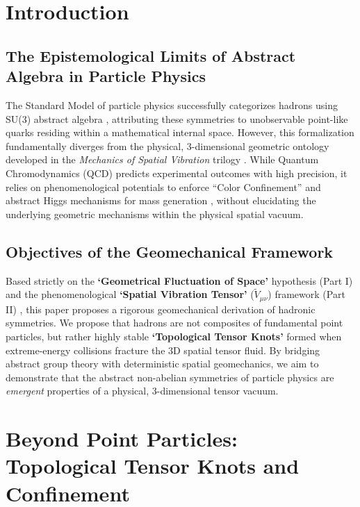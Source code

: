 \documentclass[reprint,amsmath,amssymb,aps,prd]{revtex4-2}
\begin{document}
\maketitle

\section{Introduction}

\subsection{The Epistemological Limits of Abstract Algebra in Particle Physics}
The Standard Model of particle physics successfully categorizes hadrons using SU(3) abstract algebra \cite{GellMann1964}, attributing these symmetries to unobservable point-like quarks residing within a mathematical internal space. However, this formalization fundamentally diverges from the physical, 3-dimensional geometric ontology developed in the \textit{Mechanics of Spatial Vibration} trilogy \cite{YooPart1, YooPart2, YooPart3}. While Quantum Chromodynamics (QCD) predicts experimental outcomes with high precision, it relies on phenomenological potentials to enforce ``Color Confinement'' \cite{Wilson1974} and abstract Higgs mechanisms for mass generation \cite{Higgs1964}, without elucidating the underlying geometric mechanisms within the physical spatial vacuum.

\subsection{Objectives of the Geomechanical Framework}
Based strictly on the \textbf{`Geometrical Fluctuation of Space'} hypothesis (Part I) \cite{YooPart1} and the phenomenological \textbf{`Spatial Vibration Tensor'} ($\tilde{V}_{\mu\nu}$) framework (Part II) \cite{YooPart2}, this paper proposes a rigorous geomechanical derivation of hadronic symmetries. We propose that hadrons are not composites of fundamental point particles, but rather highly stable \textbf{`Topological Tensor Knots'} formed when extreme-energy collisions fracture the 3D spatial tensor fluid. By bridging abstract group theory with deterministic spatial geomechanics, we aim to demonstrate that the abstract non-abelian symmetries of particle physics are \textit{emergent} properties of a physical, 3-dimensional tensor vacuum.

\section{Beyond Point Particles: Topological Tensor Knots and Confinement}
\end{document}

